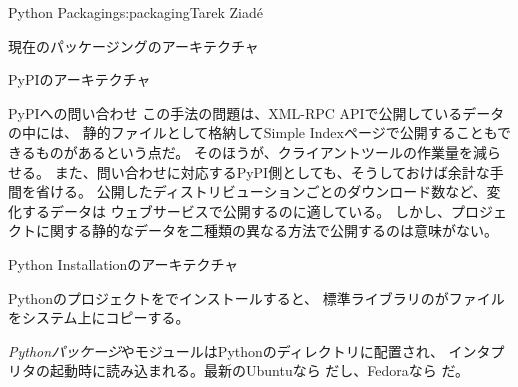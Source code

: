 \begin{aosachapter}{Python Packaging}{s:packaging}{Tarek Ziad\'{e}}
\begin{aosasect1}{現在のパッケージングのアーキテクチャ}
\begin{aosasect2}{PyPIのアーキテクチャ}
\begin{aosasect3}{PyPIへの問い合わせ}
\noindent
この手法の問題は、XML-RPC APIで公開しているデータの中には、
静的ファイルとして格納してSimple Indexページで公開することもできるものがあるという点だ。
そのほうが、クライアントツールの作業量を減らせる。
また、問い合わせに対応するPyPI側としても、そうしておけば余計な手間を省ける。
公開したディストリビューションごとのダウンロード数など、変化するデータは
ウェブサービスで公開するのに適している。
しかし、プロジェクトに関する静的なデータを二種類の異なる方法で公開するのは意味がない。

\end{aosasect3}

\end{aosasect2}

\begin{aosasect2}{Python Installationのアーキテクチャ}

Pythonのプロジェクトをでインストールすると、
標準ライブラリのがファイルをシステム上にコピーする。

\begin{aosaitemize}

  \item \emph{Pythonパッケージ}やモジュールはPythonのディレクトリに配置され、
  インタプリタの起動時に読み込まれる。最新のUbuntuなら
  だし、Fedoraなら
  だ。


\end{aosaitemize}
\end{aosasect2}
\end{aosasect1}
\end{aosachapter}
